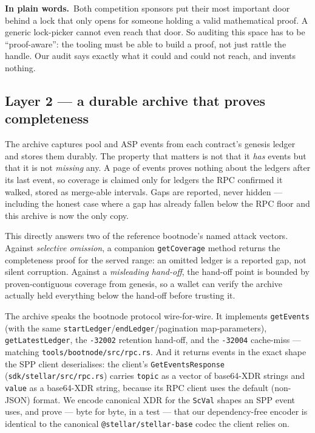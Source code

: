 \documentclass[11pt]{article}
\newcommand{\intuition}[1]{%
  \par\vspace{0.5em}%
  \noindent\colorbox{soft}{\parbox{\dimexpr\linewidth-2\fboxsep}{%
  \small\textbf{\color{klein}In plain words.}\ #1}}%
  \par\vspace{0.5em}%
}
\newcommand{\code}[1]{\texttt{\small #1}}
\begin{document}
\intuition{Both competition sponsors put their most important door behind a lock
that only opens for someone holding a valid mathematical proof. A generic
lock-picker cannot even reach that door. So auditing this space has to be
``proof-aware'': the tooling must be able to build a proof, not just rattle the
handle. Our audit says exactly what it could and could not reach, and invents
nothing.}

\subsection{Layer 2 --- a durable archive that proves completeness}

The archive captures pool and ASP events from each contract's genesis ledger and
stores them durably. The property that matters is not that it \emph{has} events
but that it is not \emph{missing} any. A page of events proves nothing about the
ledgers after its last event, so coverage is claimed only for ledgers the RPC
confirmed it walked, stored as merge-able intervals. Gaps are reported, never
hidden --- including the honest case where a gap has already fallen below the RPC
floor and this archive is now the only copy.

This directly answers two of the reference bootnode's named attack vectors.
Against \emph{selective omission}, a companion \code{getCoverage} method returns
the completeness proof for the served range: an omitted ledger is a reported gap,
not silent corruption. Against a \emph{misleading hand-off}, the hand-off point is
bounded by proven-contiguous coverage from genesis, so a wallet can verify the
archive actually held everything below the hand-off before trusting it.

The archive speaks the bootnode protocol wire-for-wire. It implements
\code{getEvents} (with the same \code{startLedger}/\code{endLedger}/pagination
map-parameters), \code{getLatestLedger}, the \code{-32002} retention hand-off, and
the \code{-32004} cache-miss --- matching \code{tools/bootnode/src/rpc.rs}. And it
returns events in the exact shape the SPP client deserialises: the client's
\code{GetEventsResponse} (\code{sdk/stellar/src/rpc.rs}) carries \code{topic} as a
vector of base64-XDR strings and \code{value} as a base64-XDR string, because its
RPC client uses the default (non-JSON) format. We encode canonical XDR for the
\code{ScVal} shapes an SPP event uses, and prove --- byte for byte, in a test ---
that our dependency-free encoder is identical to the canonical
\code{@stellar/stellar-base} codec the client relies on.
\end{document}
